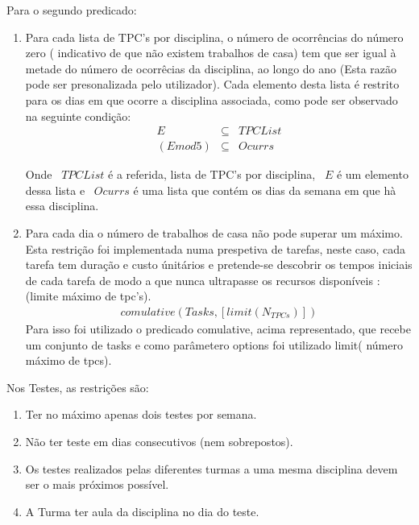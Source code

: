 \documentclass{llncs}
\begin{document}
Para o segundo predicado:
\begin{enumerate}
\item Para cada lista de TPC's por disciplina, o número de ocorrências do número zero ( indicativo de que não existem trabalhos de casa) tem que ser igual à metade do número de ocorrêcias da disciplina, ao longo do ano (Esta razão pode ser presonalizada pelo utilizador).
Cada elemento desta lista é restrito para os dias em que ocorre a disciplina associada, como pode ser observado na seguinte condição:
\begin{equation}
\begin{array}{rcl}
 E &\subseteq& TPCList \\
 (E mod 5) &\subseteq& Ocurrs
\end{array}
\end{equation}

Onde ~$TPCList$ é a referida, lista de TPC's por disciplina, ~$E$ é um elemento dessa lista e ~$Ocurrs$ é uma lista que contém os dias da semana em que hà essa disciplina.

\item Para cada dia o número de trabalhos de casa não pode superar um máximo.
Esta restrição foi implementada numa prespetiva de tarefas, neste caso, cada tarefa tem duração e custo únitários e pretende-se descobrir os tempos iniciais de cada tarefa de modo a que nunca ultrapasse os recursos disponíveis : (limite máximo de tpc's).
\begin{equation}
\begin{array}{rcl}
 comulative( Tasks, [limit(N_{TPCs})])
\end{array}
\end{equation}
Para isso foi utilizado o predicado comulative, acima representado, que recebe um conjunto de tasks e como parâmetero options foi utilizado limit( número máximo de tpcs).

\end{enumerate}

Nos Testes, as restrições são:

\begin{enumerate}
\item Ter no máximo apenas dois testes por semana.

\item Não ter teste em dias consecutivos (nem sobrepostos).

\item Os testes realizados pelas diferentes turmas a uma mesma disciplina devem ser o mais próximos possível.

\item A Turma ter aula da disciplina no dia do teste.
\end{enumerate}
\end{document}
